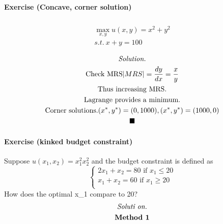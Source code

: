 \documentclass{article}
\newcommand{\tx}[1]{\text{{#1}}}
\begin{document}
\paragraph{Exercise (Concave, corner solution)}
\begin{multline*}
	\\
	\max_{x, y} u(x,y) = x^2 + y^2 \\
	s.t.\ x + y = 100 \\
\end{multline*}
\begin{multline*}
	\emph{Solution.} \\
	\tx{Check MRS} \vert MRS \vert = \frac{dy}{dx} = \frac{x}{y} \\
	\tx{Thus increasing MRS.} \\
	\tx{Lagrange provides a minimum.} \\
	\tx{Corner solutions.} (x^*, y^*) = (0, 1000), (x^*, y^*) = (1000, 0)\\
	\blacksquare
\end{multline*}

\paragraph{Exercise (kinked budget constraint)} Suppose $u(x_1, x_2) = x_1^2 x_2^2$ and the budget constraint is defined as 
\[
	\begin{cases}
		2x_1 + x_2 = 80 \tx{ if } x_1 \leq 20 \\
		x_1 + x_2 = 60 \tx{ if } x_1 \geq 20 \\
	\end{cases}
\]
How does the optimal x_1 compare to 20?
\begin{multline*}
	\emph{Soluti on.} \\
	\textbf{Method 1} \\
\end{multline*}
\end{document}

